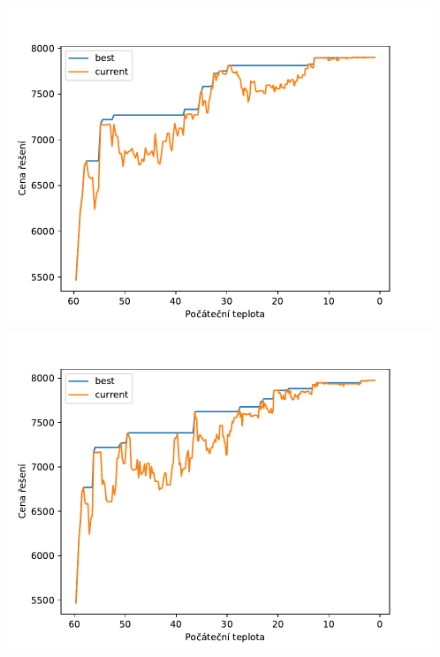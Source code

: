 \documentclass[11pt]{article}
\begin{document}
\begin{figure}
	\centering
    \begin{minipage}[c]{0.48\textwidth}
        \centering\includegraphics[width=\textwidth]{img/993.pdf} 
    \end{minipage}
    \begin{minipage}[c]{0.48\textwidth}
        \centering \includegraphics[width=\textwidth]{img/995.pdf} 
    \end{minipage}
    \\
    \begin{minipage}[c]{0.48\textwidth}

\end{minipage}
\end{figure}
\end{document}

